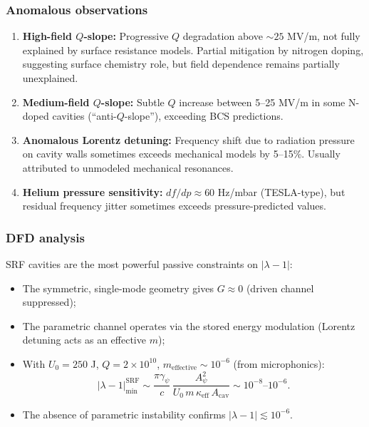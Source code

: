 \documentclass[12pt,letterpaper]{article}
\begin{document}
\subsubsection{Anomalous observations}
\begin{enumerate}
  \item \textbf{High-field $Q$-slope:}
    Progressive $Q$ degradation above $\sim 25$ MV/m, not fully
    explained by surface resistance models.  Partial mitigation
    by nitrogen doping, suggesting surface chemistry role, but
    field dependence remains partially unexplained.

  \item \textbf{Medium-field $Q$-slope:}
    Subtle $Q$ increase between 5--25 MV/m in some N-doped cavities
    (``anti-$Q$-slope''), exceeding BCS predictions.

  \item \textbf{Anomalous Lorentz detuning:}
    Frequency shift due to radiation pressure on cavity walls
    sometimes exceeds mechanical models by 5--15\%.  Usually
    attributed to unmodeled mechanical resonances.

  \item \textbf{Helium pressure sensitivity:}
    $df/dp \approx 60$ Hz/mbar (TESLA-type), but residual frequency
    jitter sometimes exceeds pressure-predicted values.
\end{enumerate}

\subsubsection{DFD analysis}

SRF cavities are the most powerful passive constraints on $|\lambda - 1|$:
\begin{itemize}[noitemsep]
  \item The symmetric, single-mode geometry gives $G \approx 0$
    (driven channel suppressed);
  \item The parametric channel operates via the stored energy
    modulation (Lorentz detuning acts as an effective $m$);
  \item With $U_0 = 250$ J, $Q = 2\times 10^{10}$,
    $m_{\text{effective}} \sim 10^{-6}$ (from microphonics):
    \begin{equation}
      |\lambda - 1|_{\min}^{\text{SRF}}
      \sim \frac{\pi\gamma_\psi}{c}\,
        \frac{A_\psi^2}{U_0\,m\,\kappa_{\text{eff}}\,A_{\text{cav}}}
      \sim 10^{-8}\text{--}10^{-6}.
    \end{equation}
  \item The absence of parametric instability confirms
    $|\lambda - 1| \lesssim 10^{-6}$.
\end{itemize}
\end{document}
